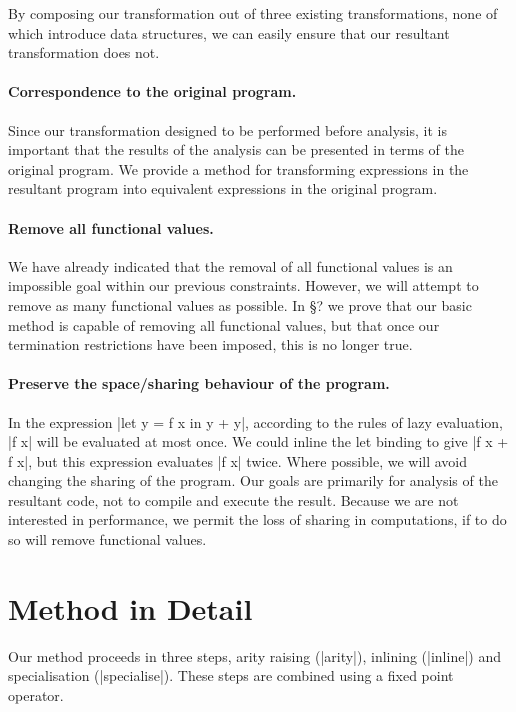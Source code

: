 \documentclass[preprint]{sigplanconf}
\begin{document}
By composing our transformation out of three existing transformations, none of which introduce data structures, we can easily ensure that our resultant transformation does not.

\paragraph{Correspondence to the original program.} Since our transformation designed to be performed before analysis, it is important that the results of the analysis can be presented in terms of the original program. We provide a method for transforming expressions in the resultant program into equivalent expressions in the original program.

\paragraph{Remove all functional values.} We have already indicated that the removal of all functional values is an impossible goal within our previous constraints. However, we will attempt to remove as many functional values as possible. In \S? we prove that our basic method is capable of removing all functional values, but that once our termination restrictions have been imposed, this is no longer true.

\paragraph{Preserve the space/sharing behaviour of the program.} In the expression |let y = f x in y + y|, according to the rules of lazy evaluation, |f x| will be evaluated at most once. We could inline the let binding to give |f x + f x|, but this expression evaluates |f x| twice. Where possible, we will avoid changing the sharing of the program. Our goals are primarily for analysis of the resultant code, not to compile and execute the result. Because we are not interested in performance, we permit the loss of sharing in computations, if to do so will remove functional values.

\section{Method in Detail}

Our method proceeds in three steps, arity raising (|arity|), inlining (|inline|) and specialisation (|specialise|). These steps are combined using a fixed point operator.
\end{document}
